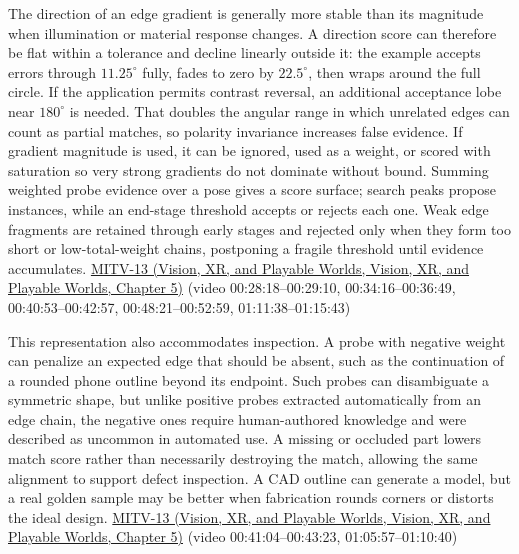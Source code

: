 The direction of an edge gradient is generally more stable than its magnitude when illumination or material response changes. A direction score can therefore be flat within a tolerance and decline linearly outside it: the example accepts errors through \(11.25^\circ\) fully, fades to zero by \(22.5^\circ\), then wraps around the full circle. If the application permits contrast reversal, an additional acceptance lobe near \(180^\circ\) is needed. That doubles the angular range in which unrelated edges can count as partial matches, so polarity invariance increases false evidence. If gradient magnitude is used, it can be ignored, used as a weight, or scored with saturation so very strong gradients do not dominate without bound. Summing weighted probe evidence over a pose gives a score surface; search peaks propose instances, while an end-stage threshold accepts or rejects each one. Weak edge fragments are retained through early stages and rejected only when they form too short or low-total-weight chains, postponing a fragile threshold until evidence accumulates. \href{../07-Vision-XR-and-Playable-Worlds/main.pdf\#nameddest=04-visual-computing-ii-ch036-mitv-13---object-detection-recognition-and-pose-determination-patquick-us-7016539}{MITV-13 (Vision, XR, and Playable Worlds, Vision, XR, and Playable Worlds, Chapter 5)} (video 00:28:18--00:29:10, 00:34:16--00:36:49, 00:40:53--00:42:57, 00:48:21--00:52:59, 01:11:38--01:15:43)

This representation also accommodates inspection. A probe with negative weight can penalize an expected edge that should be absent, such as the continuation of a rounded phone outline beyond its endpoint. Such probes can disambiguate a symmetric shape, but unlike positive probes extracted automatically from an edge chain, the negative ones require human-authored knowledge and were described as uncommon in automated use. A missing or occluded part lowers match score rather than necessarily destroying the match, allowing the same alignment to support defect inspection. A CAD outline can generate a model, but a real golden sample may be better when fabrication rounds corners or distorts the ideal design. \href{../07-Vision-XR-and-Playable-Worlds/main.pdf\#nameddest=04-visual-computing-ii-ch036-mitv-13---object-detection-recognition-and-pose-determination-patquick-us-7016539}{MITV-13 (Vision, XR, and Playable Worlds, Vision, XR, and Playable Worlds, Chapter 5)} (video 00:41:04--00:43:23, 01:05:57--01:10:40)

